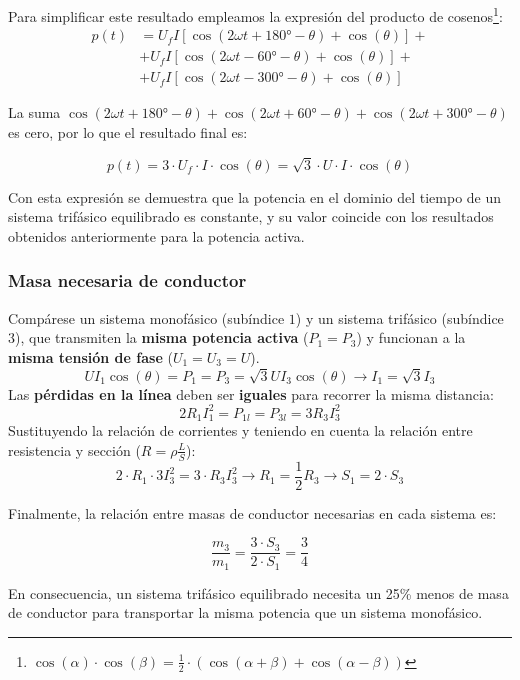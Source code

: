 Para simplificar este resultado empleamos la expresión del producto de cosenos\footnote{$
  \cos(\alpha) \cdot \cos(\beta) = \frac{1}{2} \cdot (\cos(\alpha + \beta) + \cos(\alpha - \beta))$}:
\begin{align*}
  p(t) &= U_f I [\cos(2 \omega t + \ang{180} -\theta) + \cos(\theta)] +\\
       &+ U_f I [\cos(2 \omega t - \ang{60} - \theta) + \cos(\theta)] +\\
       &+ U_f I [\cos(2 \omega t - \ang{300} - \theta) + \cos(\theta)]
\end{align*}

La suma $\cos(2 \omega t + \ang{180} -\theta) + \cos(2 \omega t + \ang{60} -\theta) + \cos(2 \omega t + \ang{300} -\theta)$ es cero, por lo que el resultado final es:

\[
  p(t) = 3 \cdot U_f \cdot I \cdot \cos (\theta) = \sqrt{3} \cdot U \cdot I \cdot \cos (\theta) 
\]

Con esta expresión se demuestra que la potencia en el dominio del tiempo de un sistema trifásico equilibrado es constante, y su valor coincide con los resultados obtenidos anteriormente para la potencia activa. 


        \subsubsection{Masa necesaria de conductor}

        Compárese un sistema monofásico (subíndice $1$) y un sistema trifásico (subíndice $3$), que transmiten la \textbf{misma potencia activa} ($P_1=P_3$) y funcionan a la \textbf{misma tensión de fase} ($U_1=U_3=U$).
\[
U I_1 \cos(\theta) = P_1 = P_3 = \sqrt{3}U I_3 \cos(\theta) \rightarrow {I_1 = \sqrt{3} I_3}
\]
Las \textbf{pérdidas en la línea} deben ser \textbf{iguales} para recorrer la {misma distancia}:
\[
  2R_1I_1^2 = P_{1l} = P_{3l} = 3R_3I_3^2
\]
Sustituyendo la relación de corrientes y teniendo en cuenta la relación entre resistencia y sección ($R=\rho\frac{L}{S}$):
\[
  2\cdot R_1 \cdot 3I_3^2 = 3\cdot R_3 I_3^2 \rightarrow R_1 = \frac{1}{2} R_3 \rightarrow {S_1 = 2 \cdot S_3}
\]

Finalmente, la relación entre masas de conductor necesarias en cada sistema es:

\[
  \frac{m_3}{m_1} = \frac{3 \cdot S_3}{2 \cdot S_1} = \frac{3}{4}
\]

En consecuencia, un sistema trifásico equilibrado necesita un 25\% menos de masa de conductor para transportar la misma potencia que un sistema monofásico.

